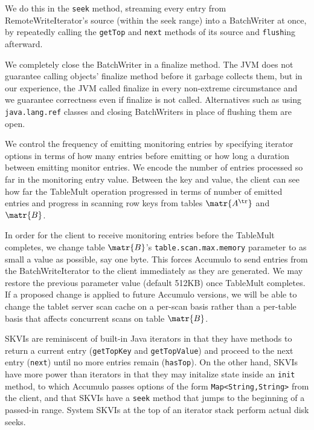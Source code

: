 We do this in the \texttt{seek} method,
streaming every entry from RemoteWriteIterator's source (within the seek range) into a BatchWriter at once, 
by repeatedly calling the \texttt{getTop} and \texttt{next} methods of its source and \texttt{flush}ing afterward.

We completely close the BatchWriter in a finalize method.
The JVM does not guarantee calling objects' finalize method before it garbage collects them, 
but in our experience, the JVM called finalize in every non-extreme circumstance
and we guarantee correctness even if finalize is not called. Alternatives such as using \texttt{java.lang.ref}
classes and closing BatchWriters in place of flushing them are open.



We control the frequency of emitting monitoring entries by specifying iterator options in terms of how many entries
before emitting or how long a duration between emitting monitor entries. We encode the number of entries processed so far 
in the monitoring entry value. Between the key and value, the client can see how far the TableMult operation progressed
in terms of number of emitted entries and progress in scanning row keys from tables $\matr{A^\tr}$ and $\matr{B}$.



In order for the client to receive monitoring entries before the TableMult completes,
we change table $\matr{B}$'s \texttt{table.scan.max.memory} parameter to as small a value as possible, say one byte. 
This forces Accumulo to send entries from the BatchWriteIterator to the client immediately as they are generated.
We may restore the previous parameter value (default 512KB) once TableMult completes.
If a proposed change \cite{ACCUMULO-261} is applied to future Accumulo versions,
we will be able to change the tablet server scan cache on a per-scan basis rather than a per-table basis
that affects concurrent scans on table $\matr{B}$.




SKVIs are reminiscent of built-in Java iterators %
in that they have methods to return a current entry (\texttt{getTopKey} and \texttt{getTopValue})
and proceed to the next entry (\texttt{next}) until no more entries remain (\texttt{hasTop}).
On the other hand, SKVIs have more power than iterators in that they may initalize state
inside an \texttt{init} method, to which Accumulo passes
options of the form \texttt{Map<String,String>} from the client,
and that SKVIs have a \texttt{seek} method that jumps to the beginning of a passed-in range. 
System SKVIs at the top of an iterator stack perform actual disk seeks.%

